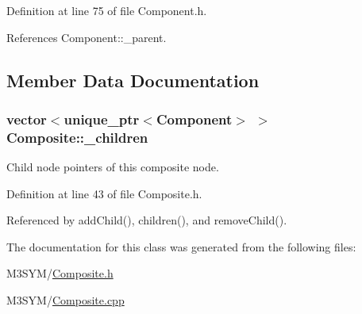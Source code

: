 Definition at line 75 of file Component.\+h.



References Component\+::\+\_\+parent.



\subsection{Member Data Documentation}
\hypertarget{classComposite_a46a76879df0f619b5b4d4861d4079789}{
\subsubsection[{\+\_\+children}]{\setlength{\rightskip}{0pt plus 5cm}vector$<$unique\+\_\+ptr$<${\bf Component}$>$ $>$ Composite\+::\+\_\+children\hspace{0.3cm}{\ttfamily [private]}}}\label{classComposite_a46a76879df0f619b5b4d4861d4079789}


Child node pointers of this composite node. 



Definition at line 43 of file Composite.\+h.



Referenced by add\+Child(), children(), and remove\+Child().



The documentation for this class was generated from the following files\+:\begin{DoxyCompactItemize}
\item 
M3\+S\+Y\+M/\hyperlink{Composite_8h}{Composite.\+h}\item 
M3\+S\+Y\+M/\hyperlink{Composite_8cpp}{Composite.\+cpp}\end{DoxyCompactItemize}
